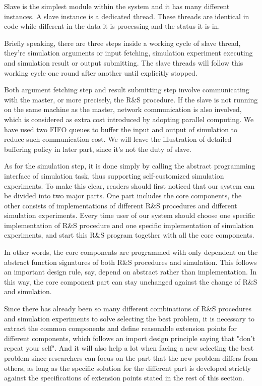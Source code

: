 Slave is the simplest module within the system and it has many different instances. A slave instance is a dedicated thread. These threads are identical in code while different in the data it is processing and the status it is in.

Briefly speaking, there are three steps inside a working cycle of slave thread, they're simulation arguments or input fetching, simulation experiment executing and simulation result or output submitting. The slave threads will follow this working cycle one round after another until explicitly stopped.

Both argument fetching step and result submitting step involve communicating with the master, or more precisely, the R\&S procedure. If the slave is not running on the same machine as the master, network communication is also involved, which is considered as extra cost introduced by adopting parallel computing. We have used two FIFO queues to buffer the input and output of simulation to reduce such communication cost. We will leave the illustration of detailed buffering policy in later part, since it's not the duty of slave.

As for the simulation step, it is done simply by calling the abstract programming interface of simulation task, thus supporting self-customized simulation experiments. To make this clear, readers should first noticed that our system can be divided into two major parts. One part includes the core components, the other consists of implementations of different R\&S procedures and different simulation experiments. Every time user of our system should choose one specific implementation of R\&S procedure and one specific implementation of simulation experiments, and start this R\&S program together with all the core components.

In other words, the core components are programmed with only dependent on the abstract function signatures of both R\&S procedures and simulation. This follows an important design rule, say, depend on abstract rather than implementation. In this way, the core component part can stay unchanged against the change of R\&S and simulation.

Since there has already been so many different combinations of R\&S procedures and simulation experiments to solve selecting the best problem, it is necessary to extract the common components and define reasonable extension points for different components, which follows an import design principle saying that "don't repeat your self". And it will also help a lot when facing a new selecting the best problem since researchers can focus on the part that the new problem differs from others, as long as the specific solution for the different part is developed strictly against the specifications of extension points stated in the rest of this section.

